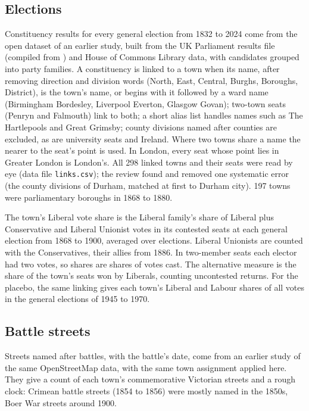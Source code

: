 \documentclass[11pt,a4paper]{article}
\begin{document}
\subsection{Elections}
Constituency results for every general election from 1832 to 2024 come from the open dataset of an earlier study, built from the UK Parliament results file (compiled from \citealp{craig1989,craig1974}) and House of Commons Library data, with candidates grouped into party families. A constituency is linked to a town when its name, after removing direction and division words (North, East, Central, Burghs, Boroughs, District), is the town's name, or begins with it followed by a ward name (Birmingham Bordesley, Liverpool Everton, Glasgow Govan); two-town seats (Penryn and Falmouth) link to both; a short alias list handles names such as The Hartlepools and Great Grimsby; county divisions named after counties are excluded, as are university seats and Ireland. Where two towns share a name the nearer to the seat's point is used. In London, every seat whose point lies in Greater London is London's. All 298 linked towns and their seats were read by eye (data file \texttt{links.csv}); the review found and removed one systematic error (the county divisions of Durham, matched at first to Durham city). 197 towns were parliamentary boroughs in 1868 to 1880.

The town's Liberal vote share is the Liberal family's share of Liberal plus Conservative and Liberal Unionist votes in its contested seats at each general election from 1868 to 1900, averaged over elections. Liberal Unionists are counted with the Conservatives, their allies from 1886. In two-member seats each elector had two votes, so shares are shares of votes cast. The alternative measure is the share of the town's seats won by Liberals, counting uncontested returns. For the placebo, the same linking gives each town's Liberal and Labour shares of all votes in the general elections of 1945 to 1970.

\subsection{Battle streets}
Streets named after battles, with the battle's date, come from an earlier study of the same OpenStreetMap data, with the same town assignment applied here. They give a count of each town's commemorative Victorian streets and a rough clock: Crimean battle streets (1854 to 1856) were mostly named in the 1850s, Boer War streets around 1900.
\end{document}

